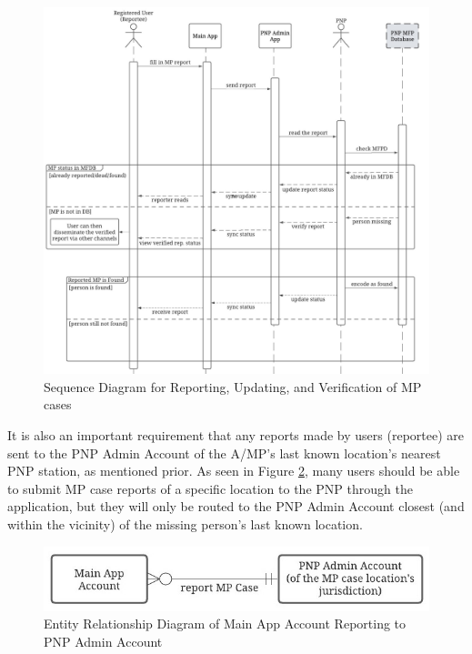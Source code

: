 \begin{figure}[ht!]
    \centering
    \includegraphics{figures/Chapter3/Chapt3_seqDiag_report.jpeg}
    \caption{Sequence Diagram for Reporting, Updating, and Verification of MP cases}
    \label{fig:seqDiaReport}
\end{figure}

It is also an important requirement that any reports made by users (reportee) are sent to the PNP Admin Account of the A/MP's last known location’s nearest PNP station, as mentioned prior. As seen in Figure \ref{fig:ERDReportee}, many users should be able to submit MP case reports of a specific location to the PNP through the application, but they will only be routed to the PNP Admin Account closest (and within the vicinity) of the missing person's last known location.
\begin{figure}[ht!]
    \centering
    \includegraphics[width=\textwidth]{figures/Chapter3/Chapt3_ERDiag_reporteePNP.jpeg}
    \caption{Entity Relationship Diagram of Main App Account Reporting to PNP Admin Account}
    \label{fig:ERDReportee}
\end{figure}

